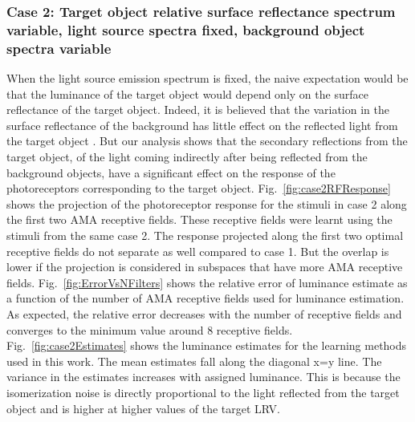 \documentclass{jov}
\begin{document}
\subsubsection{Case 2: Target object relative surface reflectance spectrum variable, light source spectra fixed, background object spectra variable}
When the light source emission spectrum is fixed, the naive expectation would be that the luminance of the target object would depend only on the surface reflectance of the target object. 
Indeed, it is believed that the variation in the surface reflectance of the background has little effect on the reflected light from the target object  \cite{BrainardWandellRetinex}. 
But our analysis shows that the secondary reflections from the target object, of the light coming indirectly after being reflected from the background objects, have a significant effect on the response of the photoreceptors corresponding to the target object. 
Fig.~{\ref{fig:case2RFResponse}} shows the projection of the photoreceptor response for the stimuli in case 2 along the first two AMA receptive fields. 
These receptive fields were learnt using the stimuli from the same case 2. 
The response projected along the first two optimal receptive fields do not separate as well compared to case 1. 
But the overlap is lower if the projection is considered in subspaces that have more AMA receptive fields. 
Fig.~\ref{fig:ErrorVsNFilters} shows the relative error of luminance estimate as a function of the number of AMA receptive fields used for luminance estimation. 
As expected, the relative error decreases with the number of receptive fields and converges to the minimum value around 8 receptive fields. 
Fig.~\ref{fig:case2Estimates} shows the luminance estimates for the learning methods used in this work. 
The mean estimates fall along the diagonal x=y line. 
The variance in the estimates increases with assigned luminance. 
This is because the isomerization noise is directly proportional to the light reflected from the target object and is higher at higher values of the target LRV.
\end{document}
